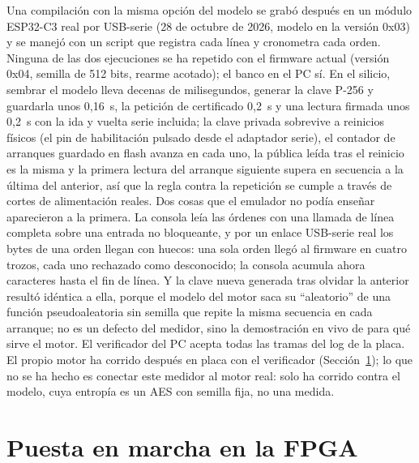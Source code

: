 Una compilación con la misma opción del modelo se grabó después en un
módulo ESP32-C3 real por USB-serie (28 de octubre de 2026, modelo en la
versión 0x03) y se manejó con un script que registra cada línea y
cronometra cada orden. Ninguna de las dos ejecuciones se ha repetido con
el firmware actual (versión 0x04, semilla de 512 bits, rearme acotado);
el banco en el PC sí. En el silicio, sembrar el modelo lleva decenas de
milisegundos, generar la clave P-256 y guardarla unos 0,16~s, la
petición de certificado 0,2~s y una lectura firmada unos 0,2~s con la ida
y vuelta serie incluida; la clave privada sobrevive a reinicios físicos
(el pin de habilitación pulsado desde el adaptador serie), el contador de
arranques guardado en flash avanza en cada uno, la pública leída tras el
reinicio es la misma y la primera lectura del arranque siguiente supera
en secuencia a la última del anterior, así que la regla contra la
repetición se cumple a través de cortes de alimentación reales. Dos cosas
que el emulador no podía enseñar aparecieron a la primera. La consola
leía las órdenes con una llamada de línea completa sobre una entrada no
bloqueante, y por un enlace USB-serie real los bytes de una orden llegan
con huecos: una sola orden llegó al firmware en cuatro trozos, cada uno
rechazado como desconocido; la consola acumula ahora caracteres hasta el
fin de línea. Y la clave nueva generada tras olvidar la anterior resultó
idéntica a ella, porque el modelo del motor saca su ``aleatorio'' de una
función pseudoaleatoria sin semilla que repite la misma secuencia en cada
arranque; no es un defecto del medidor, sino la demostración en vivo de
para qué sirve el motor. El verificador del PC acepta todas las tramas
del log de la placa. El propio motor ha corrido después en placa con el
verificador (Sección~\ref{sec:bringup}); lo que no se ha hecho es
conectar este medidor al motor real: solo ha corrido contra el modelo,
cuya entropía es un AES con semilla fija, no una medida.

\section{Puesta en marcha en la FPGA}
\label{sec:bringup}

